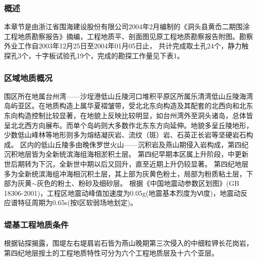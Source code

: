 \documentclass[UTF8, a4paper, 12pt]{ctexart} %
\begin{document}
\subsubsection{概述}
本章节是由浙江省围海建设股份有限公司2004年2月编制的《洞头县黄岙二期围涂工程地质勘察报告》摘编，工程地质平、剖面图见原工程地质勘察报告附图。勘察外业工作自2003年12月25日至2004年01月05日止，
共计完成取土孔24个，静力触探孔3个，十字板试验孔19个，完成的勘探工作量见下表1。
\begin{table}[h]
    \centering
    \caption{堤线勘探工作量统计表}
    \label{tab:exploration_statistics}
\end{table}

\subsubsection{区域地质概况}
围区所在地属台州湾——沙埕港低山丘陵河口堆积平原区所属乐清湾低山丘陵海湾岛屿亚区。在地质构造上属华夏褶皱带，受北北东向构造及其配套的北西向和北东东向构造控制比较显著，在地貌上反映比较明显，如台州湾外至洞头诸岛，总体皆呈北北西方向展布。而单个岛屿则大多数作北东东方向延伸。地貌多呈丘陵地形，少数低山峰林等地形则多为熔结凝灰岩、流纹（斑）岩、石英正长岩等坚硬岩石构成。
区内的低山丘陵多由晚侏罗世火山——沉积岩及燕山期侵入岩构成，第四纪沉积地层皆为全新统滨海组海相淤积土层。
第四纪早期本区属上升阶段，中更新世后期转为下沉，全新世中期以后又回升，直至近期上升仍较显著。
第四纪地层多为全新统滨海组冲海相沉积土层，其上部为灰黄色粉土，局部为粉质粘土层，下部为灰黄$\sim$灰色的粉土、粉砂及细砂层。
根据《中国地震动参数区划图》(GB 18306-2001)，工程区地震动峰值加速度为0.05g(地震基本烈度为Ⅵ度)，地震动反应谱特征周期为0.65s(按Ⅰ区软弱场地划定)。
\subsubsection{堤基工程地质条件}
根据钻探揭露，围堤左右堤肩岩石皆为燕山晚期第三次侵入的中细粒钾长花岗岩，第四纪地层按土的工程地质特性可分为六个工程地质层及十六个亚层。
\end{document}

